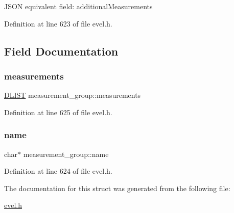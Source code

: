 J\+S\+ON equivalent field\+: additional\+Measurements 

Definition at line 623 of file evel.\+h.



\subsection{Field Documentation}
\hypertarget{structmeasurement__group_a069f918991b814c3460b041253ad1cfa}{}\label{structmeasurement__group_a069f918991b814c3460b041253ad1cfa} 
\subsubsection{\texorpdfstring{measurements}{measurements}}
{\footnotesize\ttfamily \hyperlink{double__list_8h_a45f4a129042d9e1aa4ffd31fe13e4d14}{D\+L\+I\+ST} measurement\+\_\+group\+::measurements}



Definition at line 625 of file evel.\+h.

\hypertarget{structmeasurement__group_a6ee37d1bc7453dad72b3da1a77c664bd}{}\label{structmeasurement__group_a6ee37d1bc7453dad72b3da1a77c664bd} 
\subsubsection{\texorpdfstring{name}{name}}
{\footnotesize\ttfamily char$\ast$ measurement\+\_\+group\+::name}



Definition at line 624 of file evel.\+h.



The documentation for this struct was generated from the following file\+:\begin{DoxyCompactItemize}
\item 
\hyperlink{evel_8h}{evel.\+h}\end{DoxyCompactItemize}
